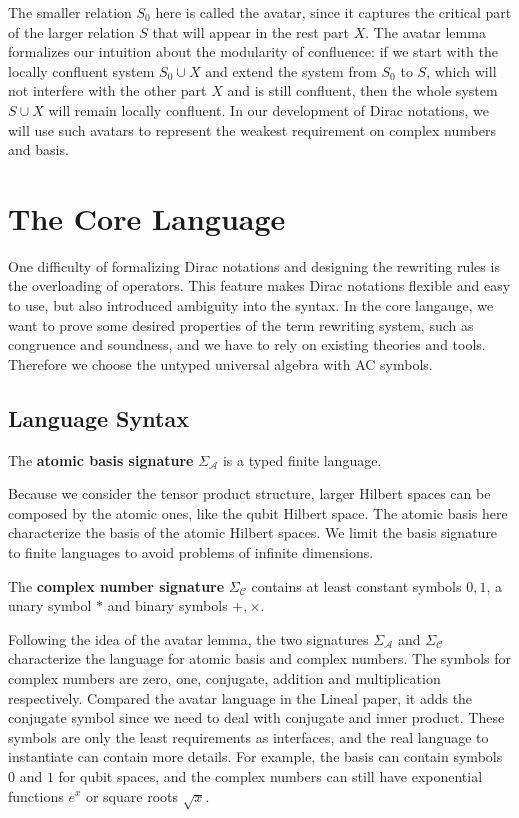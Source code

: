 \documentclass[manuscript, review, timestamp]{acmart}
\begin{document}
The smaller relation $S_0$ here is called the avatar, since it captures the critical part of the larger relation $S$ that will appear in the rest part $X$. The avatar lemma formalizes our intuition about the modularity of confluence: if we start with the locally confluent system $S_0 \cup X$ and extend the system from $S_0$ to $S$, which will not interfere with the other part $X$ and is still confluent, then the whole system $S\cup X$ will remain locally confluent. In our development of Dirac notations, we will use such avatars to represent the weakest requirement on complex numbers and basis.


\section{The Core Language}

One difficulty of formalizing Dirac notations and designing the rewriting rules is the overloading of operators. This feature makes Dirac notations flexible and easy to use, but also introduced ambiguity into the syntax. In the core langauge, we want to prove some desired properties of the term rewriting system, such as congruence and soundness, and we have to rely on existing theories and tools. Therefore we choose the untyped universal algebra with AC symbols.


\subsection{Language Syntax}

\begin{definition} 
  The \textbf{atomic basis signature} $\Sigma_\mathcal{A}$ is a  typed finite language.
\end{definition}

Because we consider the tensor product structure, larger Hilbert spaces can be composed by the atomic ones, like the qubit Hilbert space. The atomic basis here characterize the basis of the atomic Hilbert spaces.
We limit the basis signature to finite languages to avoid problems of infinite dimensions.

\begin{definition} 
  The \textbf{complex number signature} $\Sigma_\mathcal{C}$ contains at least constant symbols $0, 1$, a unary symbol $*$ and binary symbols $+, \times$.
\end{definition}

Following the idea of the avatar lemma, the two signatures $\Sigma_\mathcal{A}$ and $\Sigma_\mathcal{C}$ characterize the language for atomic basis and complex numbers. 
The symbols for complex numbers are zero, one, conjugate, addition and multiplication respectively. Compared the avatar language in the Lineal paper\cite{Arrighi2017}, it adds the conjugate symbol since we need to deal with conjugate and inner product.
These symbols are only the least requirements as interfaces, and the real language to instantiate can contain more details. For example, the basis can contain symbols $0$ and $1$ for qubit spaces, and the complex numbers can still have exponential functions $e^x$ or square roots $\sqrt{x}$.
\end{document}
